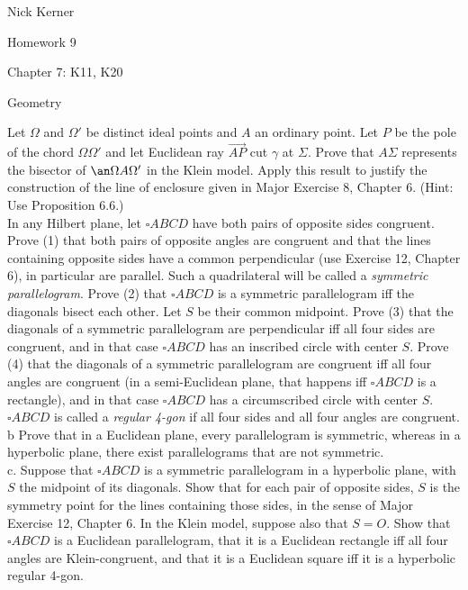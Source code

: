 \documentclass[12pt,letterpaper]{article}
\newcommand{\pro}[1]{\noindent {\bf #1}}
\newcommand{\prob}[1]{\newpage\noindent {\bf #1}}
\begin{document}
\begin{flushright}
Nick Kerner

Homework 9

Chapter 7: K11, K20

\end{flushright}
\begin{center}
\large{Geometry}\\
\end{center}

\pro{Chapter 7: K11 } Let $\Omega$ and $\Omega '$ be distinct ideal points and $A$ an ordinary point. Let $P$ be the pole of the chord $\Omega\Omega '$ and let Euclidean ray $\overrightarrow{AP}$ cut $\gamma$ at $\Sigma$. Prove that $A\Sigma$ represents the bisector of $\an\Omega A \Omega '$ in the Klein model. Apply this result to justify the construction of the line of enclosure given in Major Exercise 8, Chapter 6. (Hint: Use Proposition 6.6.) \\



\prob{Chapter 7: K20 } In any Hilbert plane, let $\square ABCD$ have both pairs of opposite sides congruent. Prove (1) that both pairs of opposite angles are congruent and that the lines containing opposite sides have a common perpendicular (use Exercise 12, Chapter 6), in particular are parallel. Such a quadrilateral will be called a \emph{symmetric parallelogram}. Prove (2) that $\square ABCD$ is a symmetric parallelogram iff the diagonals bisect each other. Let $S$ be their common midpoint. Prove (3) that the diagonals of a symmetric parallelogram are perpendicular iff all four sides are congruent, and in that case $\square ABCD$ has an inscribed circle with center $S$. Prove (4) that the diagonals of a symmetric parallelogram are congruent iff all four angles are congruent (in a semi-Euclidean plane, that happens iff $\square ABCD$ is a rectangle), and in that case $\square ABCD$ has a circumscribed circle with center $S$. $\square ABCD$ is called a \emph{regular 4-gon} if all four sides and all four angles are congruent. \\


\noindent b Prove that in a Euclidean plane, every parallelogram is symmetric, whereas in a hyperbolic plane, there exist parallelograms that are not symmetric. \\




\noindent c. Suppose that $\square ABCD$ is a symmetric parallelogram in a hyperbolic plane, with $S$ the midpoint of its diagonals. Show that for each pair of opposite sides, $S$ is the symmetry point for the lines containing those sides, in the sense of Major Exercise 12, Chapter 6. In the Klein model, suppose also that $S=O$. Show that $\square ABCD$ is a Euclidean parallelogram, that it is a Euclidean rectangle iff all four angles are Klein-congruent, and that it is a Euclidean square iff it is a hyperbolic regular 4-gon. \\
\end{document}
